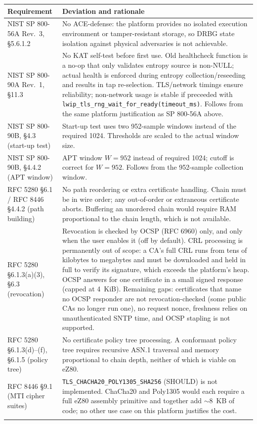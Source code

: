 \documentclass[titlepage]{report}
\renewcommand{\arraystretch}{1.5}
\begin{document}
	\renewcommand{\arraystretch}{1.3}
	\begin{longtable}{@{}>{\raggedright\arraybackslash}p{}>{\raggedright\arraybackslash}p{}@{}}
		\toprule
		\textbf{Requirement} & \textbf{Deviation and rationale} \\
		\midrule
		\endhead
		NIST SP 800-56A Rev.~3, \S5.6.1.2
		& No ACE-defense: the platform provides no isolated execution environment or tamper-resistant storage, so DRBG state isolation against physical adversaries is not achievable. \\
		\addlinespace
		NIST SP 800-90A Rev.~1, \S11.3
		& No KAT self-test before first use. Old healthcheck function is a no-op that only validates entropy source is non-NULL; actual health is enforced during entropy collection/reseeding and results in tap re-selection. TLS/network timings ensure reliability; non-network usage is stable if preceeded with \texttt{lwip\_tls\_rng\_wait\_for\_ready(timeout\_ms)}. Follows from the same platform justification as SP 800-56A above. \\
		\addlinespace
		NIST SP 800-90B, \S4.3 (start-up test)
		& Start-up test uses two 952-sample windows instead of the required 1024. Thresholds are scaled to the actual window size. \\
		\addlinespace
		NIST SP 800-90B, \S4.4.2 (APT window)
		& APT window $W = 952$ instead of required 1024; cutoff is correct for $W = 952$. Follows from the 952-sample collection window. \\
		\addlinespace
		RFC 5280 \S6.1 / RFC 8446 \S4.4.2 (path building)
		& No path reordering or extra certificate handling. Chain must be in wire order; any out-of-order or extraneous certificate aborts. Buffering an unordered chain would require RAM proportional to the chain length, which is not available. \\
		\addlinespace
		RFC 5280 \S6.1.3(a)(3), \S6.3 (revocation)
		& Revocation is checked by OCSP (RFC 6960) only, and only when the user enables it (off by default). CRL processing is permanently out of scope: a CA's full CRL runs from tens of kilobytes to megabytes and must be downloaded and held in full to verify its signature, which exceeds the platform's heap. OCSP answers for one certificate in a small signed response (capped at 4~KiB). Remaining gaps: certificates that name no OCSP responder are not revocation-checked (some public CAs no longer run one), no request nonce, freshness relies on unauthenticated SNTP time, and OCSP stapling is not supported. \\
		\addlinespace
		RFC 5280 \S6.1.3(d)--(f), \S6.1.5 (policy tree)
		& No certificate policy tree processing. A conformant policy tree requires recursive ASN.1 traversal and memory proportional to chain depth, neither of which is viable on eZ80. \\
		\addlinespace
		RFC 8446 \S9.1 (MTI cipher suites)
		& \texttt{TLS\_CHACHA20\_POLY1305\_SHA256} (SHOULD) is not implemented. ChaCha20 and Poly1305 would each require a full eZ80 assembly primitive and together add $\sim$8~KB of code; no other use case on this platform justifies the cost. \\
		\addlinespace
	\end{longtable}
\end{document}
